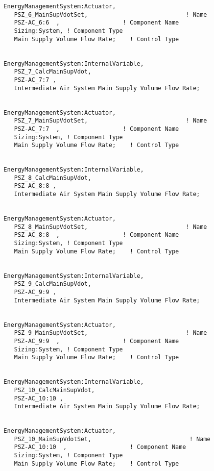 \begin{lstlisting}
  EnergyManagementSystem:Actuator,
     PSZ_6_MainSupVdotSet,                            ! Name
     PSZ-AC_6:6  ,                  ! Component Name
     Sizing:System, ! Component Type
     Main Supply Volume Flow Rate;    ! Control Type


  EnergyManagementSystem:InternalVariable,
     PSZ_7_CalcMainSupVdot,
     PSZ-AC_7:7 ,
     Intermediate Air System Main Supply Volume Flow Rate;


  EnergyManagementSystem:Actuator,
     PSZ_7_MainSupVdotSet,                            ! Name
     PSZ-AC_7:7  ,                  ! Component Name
     Sizing:System, ! Component Type
     Main Supply Volume Flow Rate;    ! Control Type


  EnergyManagementSystem:InternalVariable,
     PSZ_8_CalcMainSupVdot,
     PSZ-AC_8:8 ,
     Intermediate Air System Main Supply Volume Flow Rate;


  EnergyManagementSystem:Actuator,
     PSZ_8_MainSupVdotSet,                            ! Name
     PSZ-AC_8:8  ,                  ! Component Name
     Sizing:System, ! Component Type
     Main Supply Volume Flow Rate;    ! Control Type


  EnergyManagementSystem:InternalVariable,
     PSZ_9_CalcMainSupVdot,
     PSZ-AC_9:9 ,
     Intermediate Air System Main Supply Volume Flow Rate;


  EnergyManagementSystem:Actuator,
     PSZ_9_MainSupVdotSet,                            ! Name
     PSZ-AC_9:9  ,                  ! Component Name
     Sizing:System, ! Component Type
     Main Supply Volume Flow Rate;    ! Control Type


  EnergyManagementSystem:InternalVariable,
     PSZ_10_CalcMainSupVdot,
     PSZ-AC_10:10 ,
     Intermediate Air System Main Supply Volume Flow Rate;


  EnergyManagementSystem:Actuator,
     PSZ_10_MainSupVdotSet,                            ! Name
     PSZ-AC_10:10  ,                  ! Component Name
     Sizing:System, ! Component Type
     Main Supply Volume Flow Rate;    ! Control Type
\end{lstlisting}

